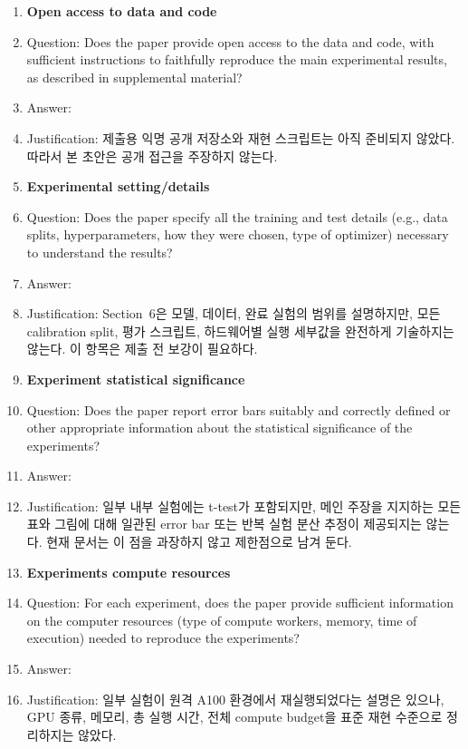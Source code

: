 \begin{enumerate}
\item {\bf Open access to data and code}
    \item[] Question: Does the paper provide open access to the data and code, with sufficient instructions to faithfully reproduce the main experimental results, as described in supplemental material?
    \item[] Answer: \answerNo{}
    \item[] Justification: 제출용 익명 공개 저장소와 재현 스크립트는 아직 준비되지 않았다. 따라서 본 초안은 공개 접근을 주장하지 않는다.

\item {\bf Experimental setting/details}
    \item[] Question: Does the paper specify all the training and test details (e.g., data splits, hyperparameters, how they were chosen, type of optimizer) necessary to understand the results?
    \item[] Answer: \answerNo{}
    \item[] Justification: Section~6은 모델, 데이터, 완료 실험의 범위를 설명하지만, 모든 calibration split, 평가 스크립트, 하드웨어별 실행 세부값을 완전하게 기술하지는 않는다. 이 항목은 제출 전 보강이 필요하다.

\item {\bf Experiment statistical significance}
    \item[] Question: Does the paper report error bars suitably and correctly defined or other appropriate information about the statistical significance of the experiments?
    \item[] Answer: \answerNo{}
    \item[] Justification: 일부 내부 실험에는 t-test가 포함되지만, 메인 주장을 지지하는 모든 표와 그림에 대해 일관된 error bar 또는 반복 실험 분산 추정이 제공되지는 않는다. 현재 문서는 이 점을 과장하지 않고 제한점으로 남겨 둔다.

\item {\bf Experiments compute resources}
    \item[] Question: For each experiment, does the paper provide sufficient information on the computer resources (type of compute workers, memory, time of execution) needed to reproduce the experiments?
    \item[] Answer: \answerNo{}
    \item[] Justification: 일부 실험이 원격 A100 환경에서 재실행되었다는 설명은 있으나, GPU 종류, 메모리, 총 실행 시간, 전체 compute budget을 표준 재현 수준으로 정리하지는 않았다.
    

\end{enumerate}
